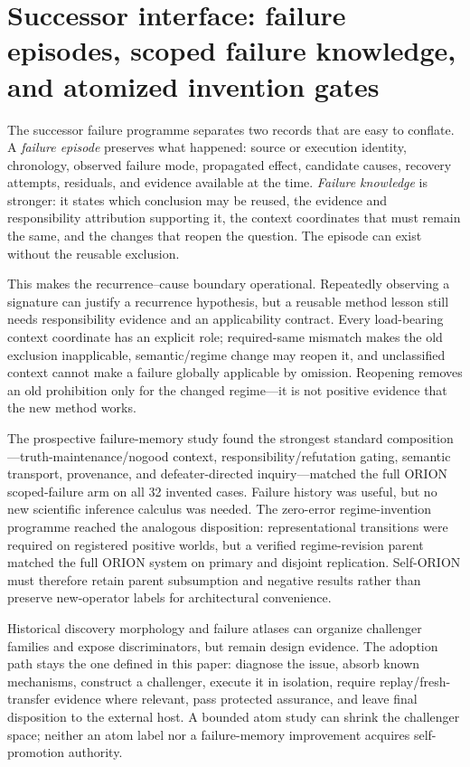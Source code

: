 \section{Successor interface: failure episodes, scoped failure knowledge, and atomized invention gates}
\label{sec:p5-successor-failure-discovery}

The successor failure programme separates two records that are easy to conflate. A \emph{failure episode} preserves what happened: source or execution identity, chronology, observed failure mode, propagated effect, candidate causes, recovery attempts, residuals, and evidence available at the time. \emph{Failure knowledge} is stronger: it states which conclusion may be reused, the evidence and responsibility attribution supporting it, the context coordinates that must remain the same, and the changes that reopen the question. The episode can exist without the reusable exclusion.

This makes the recurrence--cause boundary operational. Repeatedly observing a signature can justify a recurrence hypothesis, but a reusable method lesson still needs responsibility evidence and an applicability contract. Every load-bearing context coordinate has an explicit role; required-same mismatch makes the old exclusion inapplicable, semantic/regime change may reopen it, and unclassified context cannot make a failure globally applicable by omission. Reopening removes an old prohibition only for the changed regime---it is not positive evidence that the new method works.

The prospective failure-memory study found the strongest standard composition---truth-maintenance/nogood context, responsibility/refutation gating, semantic transport, provenance, and defeater-directed inquiry---matched the full ORION scoped-failure arm on all 32 invented cases. Failure history was useful, but no new scientific inference calculus was needed. The zero-error regime-invention programme reached the analogous disposition: representational transitions were required on registered positive worlds, but a verified regime-revision parent matched the full ORION system on primary and disjoint replication. Self-ORION must therefore retain parent subsumption and negative results rather than preserve new-operator labels for architectural convenience.

Historical discovery morphology and failure atlases can organize challenger families and expose discriminators, but remain design evidence. The adoption path stays the one defined in this paper: diagnose the issue, absorb known mechanisms, construct a challenger, execute it in isolation, require replay/fresh-transfer evidence where relevant, pass protected assurance, and leave final disposition to the external host. A bounded atom study can shrink the challenger space; neither an atom label nor a failure-memory improvement acquires self-promotion authority.
